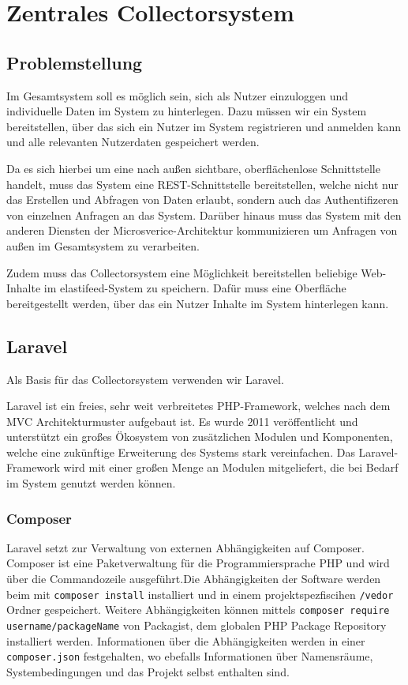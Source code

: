\chapter{Zentrales Collectorsystem}



\section{Problemstellung}
    Im Gesamtsystem soll es möglich sein, sich als Nutzer einzuloggen und individuelle Daten im System zu hinterlegen.
    Dazu müssen wir ein System bereitstellen, über das sich ein Nutzer im System registrieren und anmelden kann und alle relevanten Nutzerdaten gespeichert werden.
    
    Da es sich hierbei um eine nach außen sichtbare, oberflächenlose Schnittstelle handelt, muss das System eine REST-Schnittstelle bereitstellen, welche nicht nur das Erstellen und Abfragen von Daten erlaubt, sondern auch das Authentifizeren von einzelnen Anfragen an das System. Darüber hinaus muss das System mit den anderen Diensten der Microsverice-Architektur kommunizieren um Anfragen von außen im Gesamtsystem zu verarbeiten.
    
    Zudem muss das Collectorsystem eine Möglichkeit bereitstellen beliebige Web-Inhalte im elastifeed-System zu speichern. Dafür muss eine Oberfläche bereitgestellt werden, über das ein Nutzer Inhalte im System hinterlegen kann.

\section{Laravel}
    Als Basis für das Collectorsystem verwenden wir Laravel.
    
    Laravel ist ein freies, sehr weit verbreitetes PHP-Framework, welches nach dem MVC Architekturmuster aufgebaut ist. Es wurde 2011 veröffentlicht und unterstützt ein großes Ökosystem von zusätzlichen Modulen und Komponenten, welche eine zukünftige Erweiterung des Systems stark vereinfachen. Das Laravel-Framework wird mit einer großen Menge an Modulen mitgeliefert, die bei Bedarf im System genutzt werden können.
    
    
    \subsection{Composer}
        Laravel setzt zur Verwaltung von externen Abhängigkeiten auf Composer. Composer ist eine Paketverwaltung für die Programmiersprache PHP und wird über die Commandozeile ausgeführt.Die Abhängigkeiten der Software werden beim mit \texttt{composer install} installiert und in einem projektspezfiscihen \texttt{/vedor} Ordner gespeichert. Weitere Abhängigkeiten können mittels \texttt{composer require username/packageName} von Packagist, dem globalen PHP Package Repository installiert werden. Informationen über die Abhängigkeiten werden in einer \texttt{composer.json} festgehalten, wo ebefalls Informationen über Namensräume, Systembedingungen und das Projekt selbst enthalten sind. 
        
